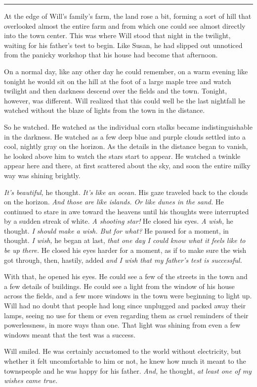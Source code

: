 \documentclass[12pt,letterpaper,oneside,english]{book}
\begin{document}
\medskip
{\centering\rule{\linewidth}{1pt}}
\smallskip

At the edge of Will's family's farm, the land rose a bit, forming a sort
of hill that overlooked almost the entire farm and from which one could
see almost directly into the town center. This was where Will stood that
night in the twilight, waiting for his father's test to begin. Like Susan,
he had slipped out unnoticed from the panicky workshop that his house had
become that afternoon.

On a normal day, like any other day he could remember, on a warm evening
like tonight he would sit on the hill at the foot of a large maple tree
and watch twilight and then darkness descend over the fields and the town.
Tonight, however, was different. Will realized that this could well be the
last nightfall he watched without the blaze of lights from the town in the
distance.

So he watched. He watched as the individual corn stalks became
indistinguishable in the darkness. He watched as a few deep blue and
purple clouds settled into a cool, nightly gray on the horizon. As the
details in the distance began to vanish, he looked above him to watch the
stars start to appear. He watched a twinkle appear here and there, at
first scattered about the sky, and soon the entire milky way was shining
brightly.

\textit{It's beautiful,} he thought. \textit{It's like an ocean.} His gaze
traveled back to the clouds on the horizon. \textit{And those are like
islands. Or like dunes in the sand.} He continued to stare in awe toward
the heavens until his thoughts were interrupted by a sudden streak of
white. \textit{A shooting star!} He closed his eyes. \textit{A wish,} he
thought. \textit{I should make a wish. But for what?} He paused for a
moment, in thought. \textit{I wish,} he began at last, \textit{that one
day I could know what it feels like to be up there.} He closed his eyes
harder for a moment, as if to make sure the wish got through, then,
hastily, added \textit{and I wish that my father's test is successful.}

With that, he opened his eyes. He could see a few of the streets in the
town and a few details of buildings. He could see a light from the window
of his house across the fields, and a few more windows in the town were
beginning to light up. Will had no doubt that people had long since
unplugged and packed away their lamps, seeing no use for them or even
regarding them as cruel reminders of their powerlessness, in more ways
than one. That light was shining from even a few windows meant that the
test was a success.

Will smiled. He was certainly accustomed to the world without electricity,
but whether it felt uncomfortable to him or not, he knew how much it meant
to the townspeople and he was happy for his father. \textit{And,} he
thought, \textit{at least one of my wishes came true.}

\end{document}
